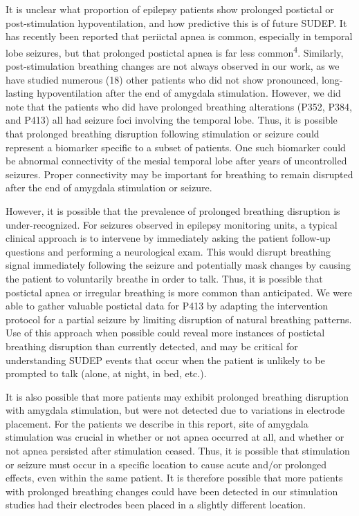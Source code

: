 \documentclass[]{article}
\begin{document}
It is unclear what proportion of epilepsy patients show prolonged
postictal or post-stimulation hypoventilation, and how predictive this
is of future SUDEP. It has recently been reported that periictal apnea
is common, especially in temporal lobe seizures, but that prolonged
postictal apnea is far less common\textsuperscript{4}. Similarly,
post-stimulation breathing changes are not always observed in our work,
as we have studied numerous (18) other patients who did not show
pronounced, long-lasting hypoventilation after the end of amygdala
stimulation. However, we did note that the patients who did have
prolonged breathing alterations (P352, P384, and P413) all had seizure
foci involving the temporal lobe. Thus, it is possible that prolonged
breathing disruption following stimulation or seizure could represent a
biomarker specific to a subset of patients. One such biomarker could 
be abnormal connectivity of the mesial temporal lobe after years of 
uncontrolled seizures. Proper connectivity may be important for breathing
to remain disrupted after the end of amygdala stimulation or seizure.

However, it is possible that the prevalence of prolonged breathing
disruption is under-recognized. For seizures observed in epilepsy
monitoring units, a typical clinical approach is to intervene by
immediately asking the patient follow-up questions and performing a
neurological exam. This would disrupt breathing signal immediately
following the seizure and potentially mask changes by causing the
patient to voluntarily breathe in order to talk. Thus, it is possible
that postictal apnea or irregular breathing is more common than
anticipated. We were able to gather valuable postictal data for P413 by
adapting the intervention protocol for a partial seizure by limiting
disruption of natural breathing patterns. Use of this approach when
possible could reveal more instances of postictal breathing disruption
than currently detected, and may be critical for understanding SUDEP
events that occur when the patient is unlikely to be prompted to talk
(alone, at night, in bed, etc.).

It is also possible that more patients may exhibit prolonged breathing
disruption with amygdala stimulation, but were not detected due to
variations in electrode placement. For the patients we describe in this
report, site of amygdala stimulation was crucial in whether or not apnea
occurred at all, and whether or not apnea persisted after stimulation
ceased. Thus, it is possible that stimulation or seizure must occur in a
specific location to cause acute and/or prolonged effects, even within
the same patient. It is therefore possible that more patients with
prolonged breathing changes could have been detected in our stimulation
studies had their electrodes been placed in a slightly different
location.
\end{document}
